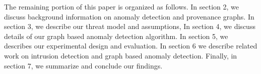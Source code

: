 %
%
%
%
%
%
%
%
%
%
%
%
%

The remaining portion of this paper is organized as follows. In section 2, we discuss background information on anomaly detection and provenance graphs. In section 3, we describe our threat model and assumptions, In section 4, we discuss details of our graph based anomaly detection algorithm. In section 5, we describes our experimental design and evaluation. In section 6 we describe related work on intrusion detection and graph based anomaly detection. Finally, in section 7, we summarize and conclude our findings.



